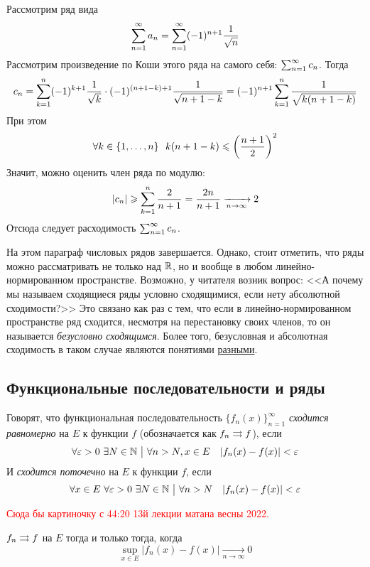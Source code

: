 \begin{example}
	Рассмотрим ряд вида
	\[
		\sum_{n = 1}^\infty a_n = \sum_{n = 1}^\infty (-1)^{n + 1} \frac{1}{\sqrt{n}}
	\]
	Рассмотрим произведение по Коши этого ряда на самого себя: $\sum_{n = 1}^\infty c_n$. Тогда
	\[
		c_n = \sum\limits_{k = 1}^n (-1)^{k + 1} \frac{1}{\sqrt{k}} \cdot (-1)^{(n + 1 - k) + 1} \frac{1}{\sqrt{n + 1 - k}} = (-1)^{n + 1} \sum\limits_{k = 1}^n \frac{1}{\sqrt{k(n + 1 - k)}}
	\]
	При этом
	\[
		\forall k \in \{1, \ldots, n\}\ \ k(n + 1 - k) \leqslant \left(\frac{n + 1}{2}\right)^2
	\]
	Значит, можно оценить член ряда по модулю:
	\[
		|c_n| \geqslant \sum\limits_{k = 1}^n \frac{2}{n + 1} = \frac{2n}{n + 1} \xrightarrow[n \to \infty]{} 2
	\]
	Отсюда следует расходимость $\sum_{n = 1}^\infty c_n$.
\end{example}

\begin{note}
	На этом параграф числовых рядов завершается. Однако, стоит отметить, что ряды можно рассматривать не только над $\mathbb{R}$, но и вообще в любом линейно-нормированном пространстве. Возможно, у читателя возник вопрос: <<А почему мы называем сходящиеся ряды условно сходящимися, если нету абсолютной сходимости?>> Это связано как раз с тем, что если в линейно-нормированном пространстве ряд сходится, несмотря на перестановку своих членов, то он называется \textit{безусловно сходящимся}. Более того, безусловная и абсолютная сходимость в таком случае являются понятиями \underline{разными}.
\end{note}

\subsection{Функциональные последовательности и ряды}

\begin{definition}
	Говорят, что функциональная последовательность $\{f_n(x)\}_{n = 1}^\infty$ \textit{сходится равномерно} на $E$ к функции $f$ (обозначается как $f_n \rightrightarrows f$), если
	\[
		\forall \varepsilon > 0\ \exists N \in \mathbb{N} \ \big|\  \forall n > N, x \in E \quad |f_n(x) - f(x)| < \varepsilon
	\]
	И \textit{сходится поточечно} на $E$ к функции $f$, если
	\[
		\forall x \in E\ \forall \eps > 0\ \exists N \in \N \such \forall n > N \quad |f_n(x) - f(x)| < \eps
	\]
\end{definition}

\textcolor{red}{Сюда бы картиночку с 44:20 13й лекции матана весны 2022.}

\begin{proposition}
	$f_n \rightrightarrows f$ на $E$ тогда и только тогда, когда
	\[
		\sup\limits_{x \in E} |f_n(x) - f(x)| \xrightarrow[n \to \infty]{} 0
	\]
\end{proposition}

